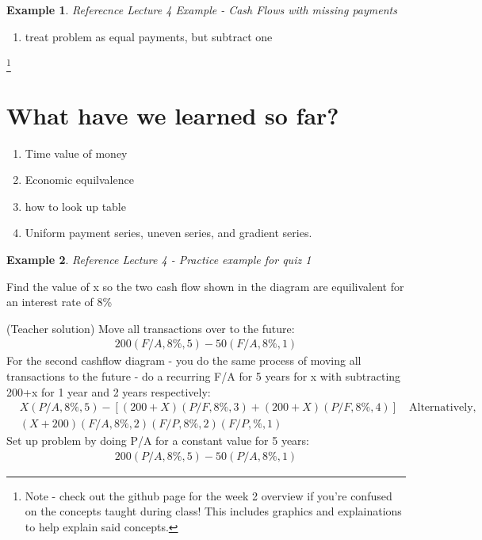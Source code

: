 \documentclass{report} %
\newtheorem{exmp}{Example}
\begin{document}
\begin{exmp}
    Referecnce Lecture 4 Example - Cash Flows with missing payments
\end{exmp}
\begin{enumerate}
    \item treat problem as equal payments, but subtract one 
\end{enumerate}

\footnote{Note - check out the github page for the week 2 overview if you're confused on the concepts taught during class! This includes graphics and explainations to help explain said concepts.}

\section*{What have we learned so far?}
\begin{enumerate}
    \item Time value of money
    \item Economic equilvalence
    \item how to look up table
    \item Uniform payment series, uneven series, and gradient series.
\end{enumerate}

\begin{exmp}
    Reference Lecture 4 - Practice example for quiz 1 
\end{exmp}
Find the value of x so the two cash flow shown in the diagram are equilivalent for an interest rate of 8\%

(Teacher solution) Move all transactions over to the future:
\begin{equation*}
    \begin{aligned}
        200(F/A,8\%,5) - 50(F/A,8\%,1) 
    \end{aligned}
\end{equation*}
For the second cashflow diagram - you do the same process of moving all transactions to the future - do a recurring F/A for 5 years for x with subtracting 200+x for 1 year and 2 years respectively:
\begin{equation*}
    \begin{aligned}
        &X(P/A,8\%,5) - [(200+X)(P/F,8\%,3)+ (200+X)(P/F,8\%,4)] \quad \text{Alternatively,} \\
        &(X+200)(F/A,8\%,2)(F/P,8\%,2)(F/P,\%,1)
    \end{aligned}
\end{equation*}
Set up problem by doing P/A for a constant value for 5 years:
\begin{equation*}
    \begin{aligned}
        200(P/A,8\%,5) - 50(P/A,8\%,1)
    \end{aligned}
\end{equation*}
\end{document}
